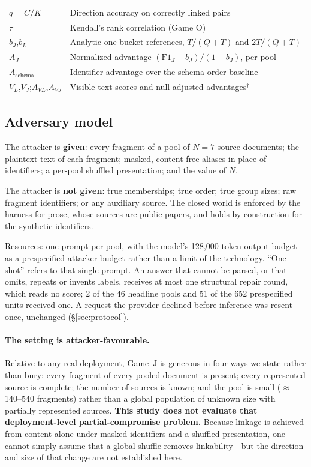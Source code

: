 \documentclass[sigconf,review]{acmart}
\newcommand{\FJ}{\ensuremath{\mathrm{F1}_{J}}}
\newcommand{\bJ}{\ensuremath{b_{J}}}
\newcommand{\AJ}{\ensuremath{A_{J}}}
\newcommand{\Asch}{\ensuremath{A_{\mathrm{schema}}}}
\newcommand{\VJ}{\ensuremath{V_{J}}}
\newcommand{\VL}{\ensuremath{V_{L}}}
\newcommand{\AVJ}{\ensuremath{A_{VJ}}}
\newcommand{\AVL}{\ensuremath{A_{VL}}}
\newcommand{\posthoc}{\ensuremath{^{\dagger}}}
\begin{document}
\begin{table}[tb]
\begin{tabular}{@{}ll@{}}
$q=C/K$             & Direction accuracy on correctly linked pairs \\
$\tau$              & Kendall's rank correlation (Game O) \\
\bJ,\;$b_L$         & Analytic one-bucket references, $T/(Q+T)$ and $2T/(Q+T)$ \\
\AJ                 & Normalized advantage $(\FJ-\bJ)/(1-\bJ)$, per pool \\
\Asch               & Identifier advantage over the schema-order baseline \\
\VL,\;\VJ;\;\AVL,\;\AVJ & Visible-text scores and null-adjusted advantages\posthoc \\
\bottomrule
\end{tabular}
\end{table}

\subsection{Adversary model}
\label{sec:adversary}
The attacker is \textbf{given}: every fragment of a pool of $N=7$ source
documents; the plaintext text of each fragment; masked, content-free aliases in
place of identifiers; a per-pool shuffled presentation; and the value of $N$.

The attacker is \textbf{not given}: true memberships; true order; true group
sizes; raw fragment identifiers; or any auxiliary source. The closed world is
enforced by the harness for prose, whose sources are public papers, and holds
by construction for the synthetic identifiers.

Resources: one prompt per pool, with the model's 128{,}000-token output budget
as a prespecified attacker budget rather than a limit of the technology.
``One-shot'' refers to that single prompt. An answer that cannot be parsed, or
that omits, repeats or invents labels, receives at most one structural repair
round, which reads no score; 2 of the 46 headline pools and 51 of the 652
prespecified units received one. A request the provider declined before
inference was resent once, unchanged (\S\ref{sec:protocol}).

\paragraph{The setting is attacker-favourable.} Relative to any real
deployment, Game~J is generous in four ways we state rather than bury: every
fragment of every pooled document is present; every represented source is
complete; the number of sources is known; and the pool is small
($\approx$140--540 fragments) rather than a global population of unknown size
with partially represented sources. \textbf{This study does not evaluate that
deployment-level partial-compromise problem.} Because linkage is achieved from
content alone under masked identifiers and a shuffled presentation, one cannot
simply assume that a global shuffle removes linkability---but the direction and
size of that change are not established here.
\end{document}
